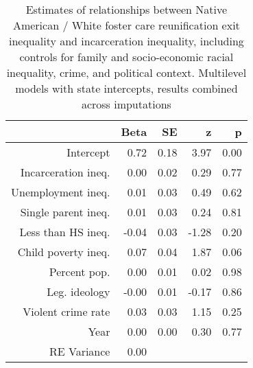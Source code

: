 \begin{table}[ht]
\centering
\caption{Estimates of relationships between Native American / White foster care reunification exit inequality and incarceration inequality, including controls for family and socio-economic racial inequality, crime, and political context. Multilevel models with state intercepts, results combined across imputations} 
\begin{tabular}{rrrrr}
  \hline
 & Beta & SE & z & p \\ 
  \hline
Intercept & 0.72 & 0.18 & 3.97 & 0.00 \\ 
  Incarceration ineq. & 0.00 & 0.02 & 0.29 & 0.77 \\ 
  Unemployment ineq. & 0.01 & 0.03 & 0.49 & 0.62 \\ 
  Single parent ineq. & 0.01 & 0.03 & 0.24 & 0.81 \\ 
  Less than HS ineq. & -0.04 & 0.03 & -1.28 & 0.20 \\ 
  Child poverty ineq. & 0.07 & 0.04 & 1.87 & 0.06 \\ 
  Percent pop. & 0.00 & 0.01 & 0.02 & 0.98 \\ 
  Leg. ideology & -0.00 & 0.01 & -0.17 & 0.86 \\ 
  Violent crime rate & 0.03 & 0.03 & 1.15 & 0.25 \\ 
  Year & 0.00 & 0.00 & 0.30 & 0.77 \\ 
  RE Variance & 0.00 &  &  &  \\ 
   \hline
\end{tabular}
\end{table}

